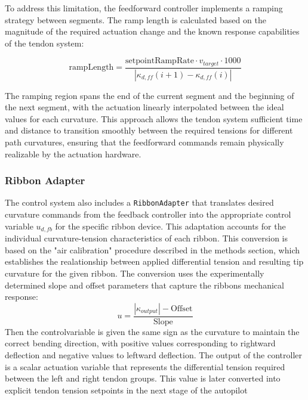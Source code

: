 To address this limitation, the feedforward controller implements a ramping strategy between segments. The ramp length is calculated based on the magnitude of the required actuation change and the known response capabilities of the tendon system:

\begin{equation}
\text{rampLength} = \frac{\text{setpointRampRate} \cdot v_{target} \cdot 1000}{|\kappa_{d,ff}(i+1) - \kappa_{d,ff}(i)|}
\end{equation}

The ramping region spans the end of the current segment and the beginning of the next segment, with the actuation linearly interpolated between the ideal values for each curvature. This approach allows the tendon system sufficient time and distance to transition smoothly between the required tensions for different path curvatures, ensuring that the feedforward commands remain physically realizable by the actuation hardware.


\subsubsection{Ribbon Adapter}
The control system also includes a \texttt{RibbonAdapter} that translates desired curvature commands from the feedback controller into the appropriate control variable \(u_{d,fb}\) for the specific ribbon device. This adaptation accounts for the individual curvature-tension characteristics of each ribbon. This conversion is based on the "air calibration" procedure described in the methods section, which establishes the realationship between applied differential tension and resulting tip curvature for the given ribbon. The conversion uses the experimentally determined slope and offset parameters that capture the ribbons mechanical response:
\begin{equation}
u = \frac{|\kappa_{output}| - \text{Offset}}{\text{Slope}}
\end{equation}
Then the controlvariable is given the same sign as the curvature to maintain the correct bending direction, with positive values corresponding to rightward deflection and negative values to leftward deflection.
\newline \newline
The output of the controller is a scalar actuation variable that represents the differential tension required between the left and right tendon groups. This value is later converted into explicit tendon tension setpoints in the next stage of the autopilot


